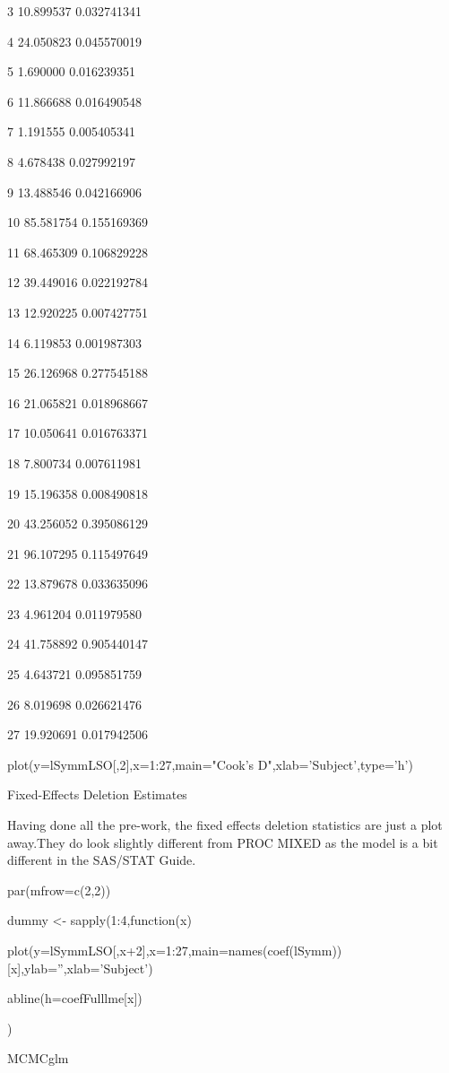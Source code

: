 3  10.899537 0.032741341

4  24.050823 0.045570019

5   1.690000 0.016239351

6  11.866688 0.016490548

7   1.191555 0.005405341

8   4.678438 0.027992197

9  13.488546 0.042166906

10 85.581754 0.155169369

11 68.465309 0.106829228

12 39.449016 0.022192784

13 12.920225 0.007427751

14  6.119853 0.001987303

15 26.126968 0.277545188

16 21.065821 0.018968667

17 10.050641 0.016763371

18  7.800734 0.007611981

19 15.196358 0.008490818

20 43.256052 0.395086129

21 96.107295 0.115497649

22 13.879678 0.033635096

23  4.961204 0.011979580

24 41.758892 0.905440147

25  4.643721 0.095851759

26  8.019698 0.026621476

27 19.920691 0.017942506


plot(y=lSymmLSO[,2],x=1:27,main="Cook's D",xlab='Subject',type='h')




Fixed-Effects Deletion Estimates

Having done all the pre-work, the fixed effects deletion statistics are just a plot away.They do look slightly different from PROC MIXED as the model is a bit different in the SAS/STAT Guide.


par(mfrow=c(2,2))

dummy <- sapply(1:4,function(x) {

  plot(y=lSymmLSO[,x+2],x=1:27,main=names(coef(lSymm))[x],ylab='',xlab='Subject')

  abline(h=coefFulllme[x])

})






MCMCglm

